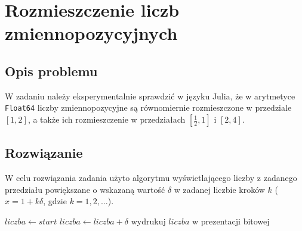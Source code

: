 \documentclass[11pt,a4paper]{article}
\begin{document}
\section{Rozmieszczenie liczb zmiennopozycyjnych}
\subsection{Opis problemu}
W zadaniu należy eksperymentalnie sprawdzić w języku Julia, że w arytmetyce \texttt{Float64} liczby zmiennopozycyjne są równomiernie rozmieszczone w przedziale $[1, 2]$, a także ich rozmieszczenie w przedziałach $[\frac{1}{2}, 1]$ i $[2, 4]$.
\subsection{Rozwiązanie}
W celu rozwiązania zadania użyto algorytmu wyświetlającego liczby z zadanego przedziału powiększane o wskazaną wartość $\delta$ w zadanej liczbie kroków $k$ ($x=1+k\delta$, gdzie $k=1, 2, \dots$).
\begin{algorithmic}
\State $liczba\gets start$
        \State $liczba\gets liczba + \delta$
        \State wydrukuj $liczba$ w prezentacji bitowej
\EndFor
\end{algorithmic}
\end{document}
